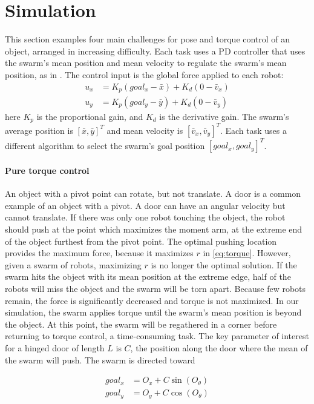 
\section{Simulation}\label{sec:simulation}
This section examples four main challenges for pose and torque control of an object, arranged in increasing difficulty.  Each task uses a PD controller that uses the swarm's mean position and mean velocity to regulate the swarm's mean position,  as in \cite{ShahrokhiIROS2015}. The control input is the global force applied to each robot:
\begin{align}
u_x &= K_{p}(goal_x - \bar{x}) + K_{d}(0-\bar{v}_x) \nonumber\\
u_y &= K_{p}(goal_y  - \bar{y}) + K_{d}(0-\bar{v}_y)  \label{eq:PDcontrolPosition}
\end{align}
here $K_{p}$ is the proportional gain, and $K_{d}$ is the derivative gain.  
The swarm's average position is $[\bar{x},\bar{y}]^T$ and mean velocity is $[\bar{v}_x,\bar{v}_y]^T$.  
Each task uses a different algorithm to select the swarm's goal position $[goal_x,goal_y]^T$.

\paragraph{Pure torque control} 
An object with a pivot point can rotate, but not translate. A door is a common example of an object with a pivot. A door can have an angular velocity but cannot translate. 
 If there was only one robot touching the object, the robot should push at the point which maximizes the moment arm, at the extreme end of the object furthest from the pivot point.
The optimal pushing location provides the maximum force, because it maximizes  $r$ in \eqref{eq:torque}.
However, given a swarm of robots, maximizing $r$ is no longer the optimal solution.  
If the swarm hits the object with its mean position at the extreme edge, half of the robots will miss the object and  the swarm will be torn apart.
Because few robots remain,  the force is significantly decreased and torque is not maximized.
 In our simulation, the swarm applies torque until the swarm's mean position is beyond the object.  At this point, the swarm will be regathered in a corner before returning to torque control, a time-consuming task. 
 The key parameter of interest for a hinged door of length $L$ is $C$, the position along the door where the mean of the swarm will push.  The swarm is directed toward 
 
\begin{align}\nonumber
goal_x &= O_x + C \sin(O_{\theta}) \\
goal_y &= O_y + C \cos(O_{\theta})  \label{eq:TorqueControl}
\end{align}

